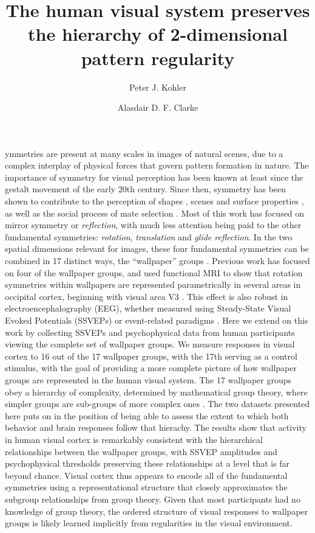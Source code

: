 \documentclass[9pt,twocolumn,twoside,lineno]{pnas-new}
\title{The human visual system preserves the hierarchy of 2-dimensional pattern regularity}
\author[a, b, 1]{Peter J. Kohler}
\author[c]{Alasdair D. F. Clarke}
\affil[a]{York University, Department of Psychology, Toronto, ON M3J 1P3, Canada}
\affil[b]{Centre for Vision Research, York University, Toronto, ON, M3J 1P3, Canada}
\affil[c]{Stanford University, Department of Psychology, Stanford, CA 94305, United States}
\affil[d]{University of Essex, Department of Psychology, Colchester, UK, CO4 3SQ}
\begin{document}
\maketitle
\thispagestyle{firststyle}

ymmetries are present at many scales in images of natural scenes, due to a complex interplay of physical forces that govern pattern formation in nature. The importance of symmetry for visual perception has been known at least since the gestalt movement of the early 20th century. Since then, symmetry has been shown to contribute to the perception of shapes \cite{RN1311,RN1682}, scenes \cite{RN1824} and surface properties \cite{RN1166}, as well as the social process of mate selection \cite{RN1337}. Most of this work has focused on mirror symmetry or \textit{reflection}, with much less attention being paid to the other fundamental symmetries: \textit{rotation}, \textit{translation} and \textit{glide reflection}. In the two spatial dimensions relevant for images, these four fundamental symmetries can be combined in 17 distinct ways, the “wallpaper” groups \cite{RN1562,RN1563,RN1425}. Previous work has focused on four of the wallpaper groups, and used functional MRI to show that rotation symmetries within wallpapers are represented parametrically in several areas in occipital cortex, beginning with visual area V3 \cite{RN1725}. This effect is also robust in electroencephalography (EEG), whether measured using Steady-State Visual Evoked Potentials (SSVEPs)\cite{RN1725} or event-related paradigms \cite{RN1959}. Here we extend on this work by collecting SSVEPs and psychophysical data from human participants viewing the complete set of wallpaper groups. We measure responses in visual cortex to 16 out of the 17 wallpaper groups, with the 17th serving as a control stimulus, with the goal of providing a more complete picture of how wallpaper groups are represented in the human visual system. The 17 wallpaper groups obey a hierarchy of complexity, determined by mathematical group theory, where simpler groups are sub-groups of more complex ones \cite{RN1711}. The two datasets presented here puts on in the position of being able to assess the extent to which both behavior and brain responses follow that hierachy. The results show that activity in human visual cortex is remarkably consistent with the hierarchical relationships between the wallpaper groups, with SSVEP amplitudes and psychophysical thresholds preserving these relationships at a level that is far beyond chance. Visual cortex thus appears to encode all of the fundamental symmetries using a representational structure that closely approximates the subgroup relationships from group theory. Given that most participants had no knowledge of group theory, the ordered structure of visual responses to wallpaper groups is likely learned implicitly from regularities in the visual environment.
\end{document}

